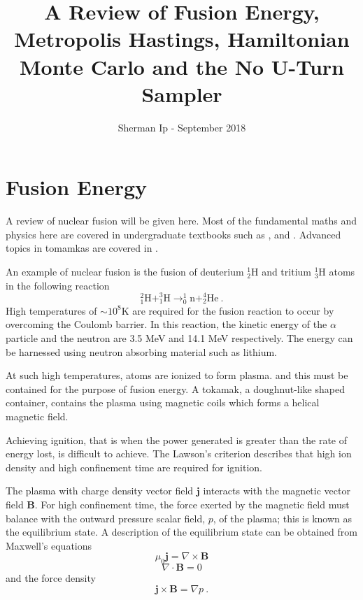 \documentclass[10pt]{proc}
\author{Sherman Ip - September 2018}
\title{A Review of Fusion Energy, Metropolis Hastings, Hamiltonian Monte Carlo and the No U-Turn Sampler}
\begin{document}
\sloppy

\maketitle

\section{Fusion Energy}
A review of nuclear fusion will be given here. Most of the fundamental maths and physics here are covered in undergraduate textbooks such as \cite{riley2006mathematical}, \cite{serway2018physics} and \cite{martin2006nuclear}. Advanced topics in tomamkas are covered in \cite{wesson2004tokamaks}.

An example of nuclear fusion is the fusion of deuterium $_{2}^{1}\textrm{H}$ and tritium $_{3}^{1}\textrm{H}$ atoms in the following reaction
\begin{equation}
  ^{2}_{1}\textrm{H} + ^{3}_{1}\textrm{H} \rightarrow
  ^{1}_{0}\textrm{n} + ^{4}_{2}\textrm{He} \ .
\end{equation}
High temperatures of $\sim 10^8 \text{K}$ are required for the fusion reaction to occur by overcoming the Coulomb barrier. In this reaction, the kinetic energy of the $\alpha$ particle and the neutron are 3.5 MeV and 14.1 MeV respectively. The energy can be harnessed using neutron absorbing material such as lithium.

At such high temperatures, atoms are ionized to form plasma. and this must be contained for the purpose of fusion energy. A tokamak, a doughnut-like shaped container, contains the plasma using magnetic coils which forms a helical magnetic field.

Achieving ignition, that is when the power generated is greater than the rate of energy lost, is difficult to achieve. The Lawson's criterion \citep{lawson1957some} describes that high ion density and high confinement time are required for ignition.

The plasma with charge density vector field $\mathbf{j}$ interacts with the magnetic vector field $\mathbf{B}$. For high confinement time, the force exerted by the magnetic field must balance with the outward pressure scalar field, $p$, of the plasma; this is known as the equilibrium state. A description of the equilibrium state can be obtained from Maxwell's equations
\begin{equation}
  \mu_0\mathbf{j}=\nabla \times \mathbf{B}
\end{equation}
\begin{equation}
  \nabla \cdot \mathbf{B} = 0
\end{equation}
and the force density
\begin{equation}
  \mathbf{j}\times\mathbf{B} = \nabla p \ .
\end{equation}
\end{document}
